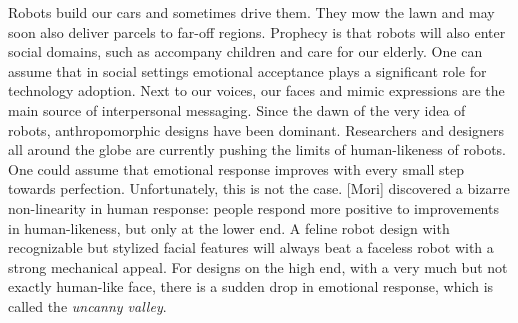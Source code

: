 \documentclass[]{svmono}
\newenvironment{Shaded}{\begin{snugshade}}{\end{snugshade}}
\newcommand{\KeywordTok}[1]{\textcolor[rgb]{0.13,0.29,0.53}{\textbf{#1}}}
\newcommand{\DataTypeTok}[1]{\textcolor[rgb]{0.13,0.29,0.53}{#1}}
\newcommand{\DecValTok}[1]{\textcolor[rgb]{0.00,0.00,0.81}{#1}}
\newcommand{\StringTok}[1]{\textcolor[rgb]{0.31,0.60,0.02}{#1}}
\newcommand{\OperatorTok}[1]{\textcolor[rgb]{0.81,0.36,0.00}{\textbf{#1}}}
\newcommand{\NormalTok}[1]{#1}
\begin{document}
Robots build our cars and sometimes drive them. They mow the lawn and
may soon also deliver parcels to far-off regions. Prophecy is that
robots will also enter social domains, such as accompany children and
care for our elderly. One can assume that in social settings emotional
acceptance plays a significant role for technology adoption. Next to our
voices, our faces and mimic expressions are the main source of
interpersonal messaging. Since the dawn of the very idea of robots,
anthropomorphic designs have been dominant. Researchers and designers
all around the globe are currently pushing the limits of human-likeness
of robots. One could assume that emotional response improves with every
small step towards perfection. Unfortunately, this is not the case.
{[}Mori{]} discovered a bizarre non-linearity in human response: people
respond more positive to improvements in human-likeness, but only at the
lower end. A feline robot design with recognizable but stylized facial
features will always beat a faceless robot with a strong mechanical
appeal. For designs on the high end, with a very much but not exactly
human-like face, there is a sudden drop in emotional response, which is
called the \emph{uncanny valley}.

\begin{Shaded}
\end{Shaded}
\end{document}
